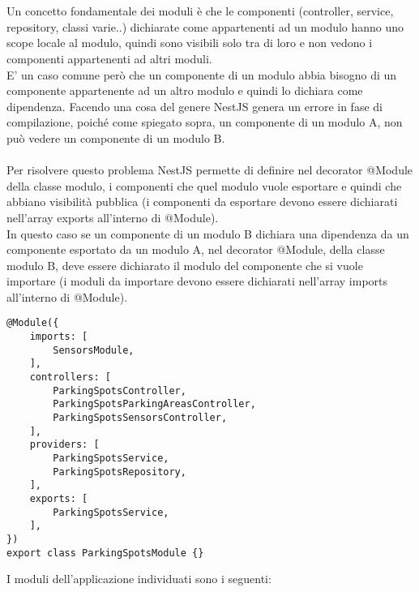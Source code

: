 \\\\
Un concetto fondamentale dei moduli è che le componenti (controller, service, repository, classi varie..) dichiarate 
come appartenenti ad un modulo hanno uno scope locale al modulo, quindi sono visibili solo tra di loro e non vedono
i componenti appartenenti ad altri moduli.
\\
E' un caso comune però che un componente di un modulo abbia bisogno di un componente appartenente ad un altro modulo
e quindi lo dichiara come dipendenza. Facendo una cosa del genere NestJS genera un errore in fase di compilazione, poiché come 
spiegato sopra, un componente di un modulo A, non può vedere un componente di un modulo B.
\\\\
Per risolvere questo problema NestJS permette di definire nel decorator @Module della classe modulo, i componenti che
quel modulo vuole esportare e quindi che abbiano visibilità pubblica (i componenti da esportare devono essere dichiarati 
nell'array exports all'interno di @Module). 
\\
In questo caso se un componente di un modulo B dichiara una 
dipendenza da un componente esportato da un modulo A, nel decorator @Module, della classe modulo B, deve essere dichiarato il
modulo del componente che si vuole importare (i moduli da importare devono essere dichiarati nell'array imports all'interno di @Module).
\\
\begin{lstlisting}
@Module({
    imports: [ 
        SensorsModule,
    ],
    controllers: [
        ParkingSpotsController, 
        ParkingSpotsParkingAreasController,
        ParkingSpotsSensorsController,
    ],
    providers: [
        ParkingSpotsService,
        ParkingSpotsRepository,
    ],
    exports: [
        ParkingSpotsService,
    ],
})
export class ParkingSpotsModule {}
\end{lstlisting}
\leavevmode\newline
I moduli dell'applicazione individuati sono i seguenti:
